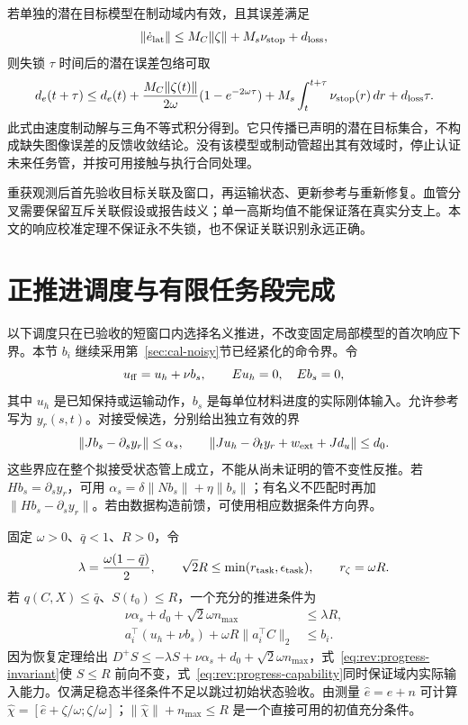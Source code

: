 \documentclass[11pt,a4paper]{article}
\numberwithin{equation}{section}
\theoremstyle{definition}
\begin{document}
若单独的潜在目标模型在制动域内有效，且其误差满足
\begin{equation}
 \|\dot e_{\rm lat}\|\le M_C\|\zeta\|+M_s\nu_{\rm stop}+d_{\rm loss},
\end{equation}
则失锁 $\tau$ 时间后的潜在误差包络可取
\begin{equation}
 d_e(t+\tau)\le d_e(t)
 +\frac{M_C\|\zeta(t)\|}{2\omega}(1-e^{-2\omega\tau})
 +M_s\int_t^{t+\tau}\nu_{\rm stop}(r)\,dr+d_{\rm loss}\tau.
 \label{eq:rev:loss-braking-tube}
\end{equation}
此式由速度制动解与三角不等式积分得到。它只传播已声明的潜在目标集合，不构成缺失图像误差的反馈收敛结论。没有该模型或制动管超出其有效域时，停止认证未来任务管，并按可用接触与执行合同处理。

重获观测后首先验收目标关联及窗口，再运输状态、更新参考与重新修复。血管分叉需要保留互斥关联假设或报告歧义；单一高斯均值不能保证落在真实分支上。本文的响应校准定理不保证永不失锁，也不保证关联识别永远正确。



\section{正推进调度与有限任务段完成}
\label{sec:rev:positive-progress}
以下调度只在已验收的短窗口内选择名义推进，不改变固定局部模型的首次响应下界。本节 $b_i$ 继续采用第~\ref{sec:cal-noisy}节已经紧化的命令界。令
\begin{equation}
 u_{\rm ff}=u_h+\nu b_s,\qquad
 Eu_h=0,\quad Eb_s=0,
 \label{eq:rev:progress-feedforward}
\end{equation}
其中 $u_h$ 是已知保持或运输动作，$b_s$ 是每单位材料进度的实际刚体输入。允许参考写为 $y_r(s,t)$。对接受候选，分别给出独立有效的界
\begin{equation}
 \|Jb_s-\partial_s y_r\|\le\alpha_s,
 \qquad
 \|Ju_h-\partial_t y_r+w_{\rm ext}+Jd_u\|\le d_0.
 \label{eq:rev:progress-residual}
\end{equation}
这些界应在整个拟接受状态管上成立，不能从尚未证明的管不变性反推。若 $Hb_s=\partial_s y_r$，可用 $\alpha_s=\delta\|Nb_s\|+\eta\|b_s\|$；有名义不匹配时再加 $\|Hb_s-\partial_s y_r\|$。若由数据构造前馈，可使用相应数据条件方向界。

固定 $\omega>0$、$\bar q<1$、$R>0$，令
\begin{equation}
 \lambda=\frac{\omega(1-\bar q)}2,\qquad
 \sqrt2R\le\min(r_{\rm task},\epsilon_{\rm task}),\qquad
 r_\zeta=\omega R.
 \label{eq:rev:progress-radius}
\end{equation}
若 $q(C,X)\le\bar q$、$S(t_0)\le R$，一个充分的推进条件为
\begin{align}
 \nu\alpha_s+d_0+\sqrt2\omega n_{\max}&\le\lambda R,
 \label{eq:rev:progress-invariant}\\
 a_i^\top(u_h+\nu b_s)+\omega R\|a_i^\top C\|_2
&\le b_i.
 \label{eq:rev:progress-capability}
\end{align}
因为恢复定理给出 $D^+S\le-\lambda S+\nu\alpha_s+d_0+\sqrt2\omega n_{\max}$，式~\eqref{eq:rev:progress-invariant}使 $S\le R$ 前向不变，式~\eqref{eq:rev:progress-capability}同时保证域内实际输入能力。仅满足稳态半径条件不足以跳过初始状态验收。由测量 $\widehat e=e+n$ 可计算 $\widehat\chi=[\widehat e+\zeta/\omega;\zeta/\omega]$；$\|\widehat\chi\|+n_{\max}\le R$ 是一个直接可用的初值充分条件。
\end{document}
